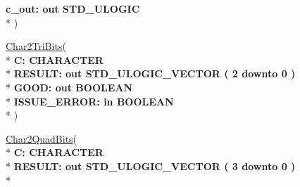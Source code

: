 \begin{DoxyCompactItemize}
  {\bfseries \textcolor{vhdlchar}{ }\textcolor{vhdlchar}{c\+\_\+out\+: }\textcolor{stringliteral}{} {\bfseries \textcolor{keywordflow}{out}\textcolor{vhdlchar}{ }\textcolor{comment}{S\+T\+D\+\_\+\+U\+L\+O\+G\+I\+C}\textcolor{vhdlchar}{ }}}\\*
   )
\item 
{\bfseries {\bfseries \textcolor{vhdlchar}{ }}} \hyperlink{class__fixed__pkg_a4a8f981dc9afd488c335109bd5680e88}{Char2\+Tri\+Bits}( \\*
{\bfseries \textcolor{vhdlchar}{ }\textcolor{vhdlchar}{C\+: }\textcolor{stringliteral}{} {\bfseries \textcolor{comment}{C\+H\+A\+R\+A\+C\+T\+E\+R}\textcolor{vhdlchar}{ }}}\\*
  {\bfseries \textcolor{vhdlchar}{ }\textcolor{vhdlchar}{R\+E\+S\+U\+L\+T\+: }\textcolor{stringliteral}{} {\bfseries \textcolor{keywordflow}{out}\textcolor{vhdlchar}{ }\textcolor{comment}{S\+T\+D\+\_\+\+U\+L\+O\+G\+I\+C\+\_\+\+V\+E\+C\+T\+O\+R}\textcolor{vhdlchar}{ }\textcolor{vhdlchar}{(}\textcolor{vhdlchar}{ }\textcolor{vhdlchar}{ } \textcolor{vhdldigit}{2} \textcolor{vhdlchar}{ }\textcolor{keywordflow}{downto}\textcolor{vhdlchar}{ }\textcolor{vhdlchar}{ } \textcolor{vhdldigit}{0} \textcolor{vhdlchar}{ }\textcolor{vhdlchar}{)}\textcolor{vhdlchar}{ }}}\\*
  {\bfseries \textcolor{vhdlchar}{ }\textcolor{vhdlchar}{G\+O\+O\+D\+: }\textcolor{stringliteral}{} {\bfseries \textcolor{keywordflow}{out}\textcolor{vhdlchar}{ }\textcolor{comment}{B\+O\+O\+L\+E\+A\+N}\textcolor{vhdlchar}{ }}}\\*
  {\bfseries \textcolor{vhdlchar}{ }\textcolor{vhdlchar}{I\+S\+S\+U\+E\+\_\+\+E\+R\+R\+O\+R\+: }\textcolor{stringliteral}{} {\bfseries \textcolor{keywordflow}{in}\textcolor{vhdlchar}{ }\textcolor{comment}{B\+O\+O\+L\+E\+A\+N}\textcolor{vhdlchar}{ }}}\\*
   )
\item 
{\bfseries {\bfseries \textcolor{vhdlchar}{ }}} \hyperlink{class__fixed__pkg_a37b717f2845e100f119484fdbe8cc7f8}{Char2\+Quad\+Bits}( \\*
{\bfseries \textcolor{vhdlchar}{ }\textcolor{vhdlchar}{C\+: }\textcolor{stringliteral}{} {\bfseries \textcolor{comment}{C\+H\+A\+R\+A\+C\+T\+E\+R}\textcolor{vhdlchar}{ }}}\\*
  {\bfseries \textcolor{vhdlchar}{ }\textcolor{vhdlchar}{R\+E\+S\+U\+L\+T\+: }\textcolor{stringliteral}{} {\bfseries \textcolor{keywordflow}{out}\textcolor{vhdlchar}{ }\textcolor{comment}{S\+T\+D\+\_\+\+U\+L\+O\+G\+I\+C\+\_\+\+V\+E\+C\+T\+O\+R}\textcolor{vhdlchar}{ }\textcolor{vhdlchar}{(}\textcolor{vhdlchar}{ }\textcolor{vhdlchar}{ } \textcolor{vhdldigit}{3} \textcolor{vhdlchar}{ }\textcolor{keywordflow}{downto}\textcolor{vhdlchar}{ }\textcolor{vhdlchar}{ } \textcolor{vhdldigit}{0} \textcolor{vhdlchar}{ }\textcolor{vhdlchar}{)}\textcolor{vhdlchar}{ }}}\\*

\end{DoxyCompactItemize}
